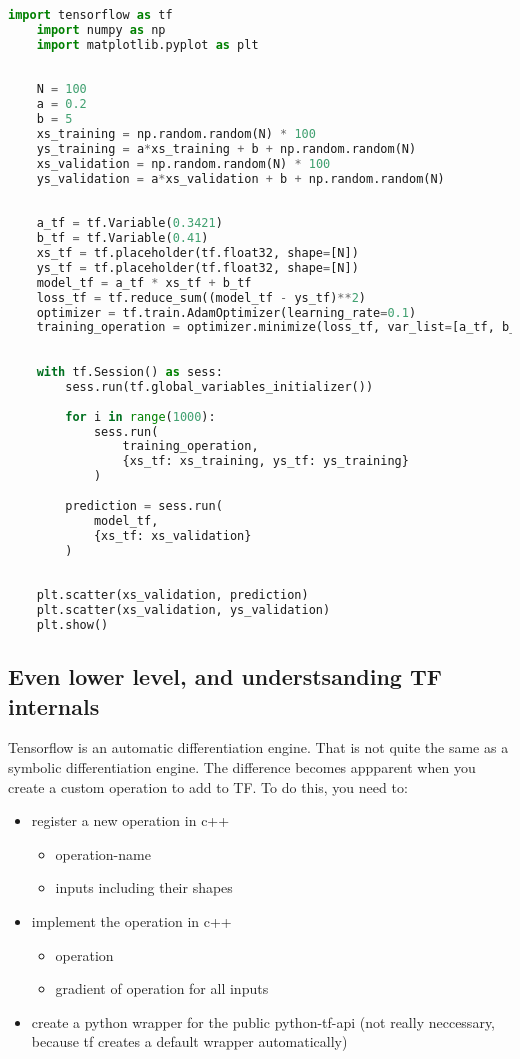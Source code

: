 \begin{lstlisting}[language=python]
    import tensorflow as tf
    import numpy as np
    import matplotlib.pyplot as plt
    
    
    N = 100
    a = 0.2
    b = 5
    xs_training = np.random.random(N) * 100
    ys_training = a*xs_training + b + np.random.random(N)
    xs_validation = np.random.random(N) * 100
    ys_validation = a*xs_validation + b + np.random.random(N)
    
    
    a_tf = tf.Variable(0.3421)
    b_tf = tf.Variable(0.41)
    xs_tf = tf.placeholder(tf.float32, shape=[N])
    ys_tf = tf.placeholder(tf.float32, shape=[N])
    model_tf = a_tf * xs_tf + b_tf
    loss_tf = tf.reduce_sum((model_tf - ys_tf)**2)
    optimizer = tf.train.AdamOptimizer(learning_rate=0.1)
    training_operation = optimizer.minimize(loss_tf, var_list=[a_tf, b_tf])
    
    
    with tf.Session() as sess:
        sess.run(tf.global_variables_initializer())
    
        for i in range(1000):
            sess.run(
                training_operation, 
                {xs_tf: xs_training, ys_tf: ys_training}
            )
    
        prediction = sess.run(
            model_tf, 
            {xs_tf: xs_validation}
        )
    
    
    plt.scatter(xs_validation, prediction)
    plt.scatter(xs_validation, ys_validation)
    plt.show()

\end{lstlisting}


\subsection{Even lower level, and understsanding TF internals}

Tensorflow is an automatic differentiation engine. That is not quite the same as a symbolic differentiation engine. The difference becomes appparent when you create a custom operation to add to TF. To do this, you need to: 

\begin{itemize}
    \item register a new operation in c++
        \begin{itemize}
            \item operation-name
            \item inputs including their shapes
        \end{itemize}
    \item implement the operation in c++
        \begin{itemize}
            \item operation
            \item gradient of operation for all inputs
        \end{itemize}
    \item create a python wrapper for the public python-tf-api (not really neccessary, because tf creates a default wrapper automatically)
\end{itemize}

